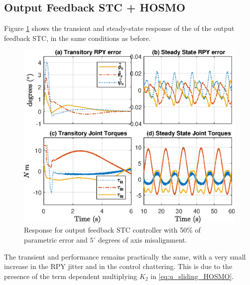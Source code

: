 \subsection{Output Feedback STC + HOSMO}

Figure \ref{fig:CDC_result2} shows the transient and steady-state response of the of the output feedback STC, in the same conditions as before. 
%
\begin{figure}[!htpb]
\centering
\includegraphics[width=0.95\columnwidth]{results/CDC_result2}
\caption{Response for output feedback STC controller with 50\% of parametric error and $5^\circ$ degrees of axis misalignment.}
\label{fig:CDC_result2}
\end{figure}
%
The transient and performance remains practically the same, with a very small increase in the RPY jitter and in the control chattering.
%
This is due to the presence of the term dependent multiplying $K_2$ in \eqref{eq:u_sliding_HOSMO}.

